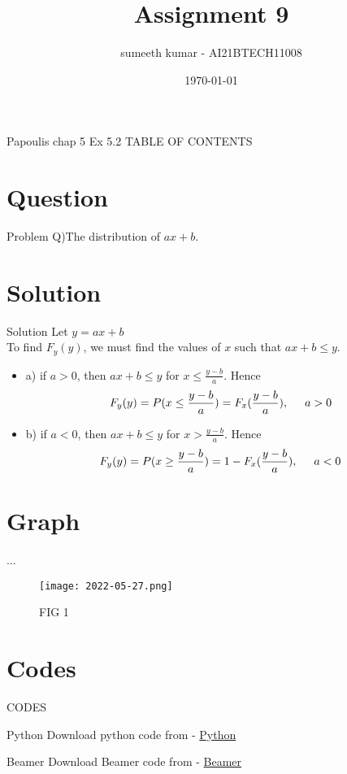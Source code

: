 \documentclass{beamer}
\title{Assignment 9}
\author{sumeeth kumar - AI21BTECH11008}
\date{\today}
\begin{document}
\begin{frame}
    \titlepage 
\end{frame}

\logo{}


\begin{frame}{Papoulis chap 5 Ex 5.2}
TABLE OF CONTENTS
    \tableofcontents
\end{frame}


\section{Question}
\begin{frame}{Problem}
Q)The distribution of $ax+b$. 
\end{frame}

\section{Solution}
\begin{frame}{Solution}
    Let $y = ax+b$ \\
    To find $F_y(y)$, we must find the values of $x$ such that $ax+b \le y$.
    \begin{itemize}
        \item a) if $a > 0$, then $ax+b \le y$ for $x \le \frac{y-b}{a}$. Hence 
        \begin{align}
            F_y(y) = P(x \le \frac{y-b}{a})= F_x(\frac{y-b}{a}) , \hspace{5mm}  a>0
        \end{align} 

        \item b) if $a < 0$, then $ax+b \le y$ for $x > \frac{y-b}{a}$. Hence 
        \begin{align}
            F_y(y) = P(x \ge \frac{y-b}{a})= 1-F_x(\frac{y-b}{a}) , \hspace{5mm}  a<0
        \end{align} 
        

        
    \end{itemize}

\end{frame}

\section{Graph}
\begin{frame}{...}
    \begin{figure}[!ht]
		\centering
		\texttt{[image: 2022-05-27.png]}
		\caption{FIG 1}
		\label{fig1}
	\end{figure}
\end{frame}

\section{Codes}
\begin{frame}{CODES}
    \begin{block}{Python}
         Download python code from - \href{...}{Python}
    \end{block}

 \begin{block}{Beamer}
         Download Beamer code from - \href{...}{Beamer}
    \end{block}
\end{frame} 
\end{document}
